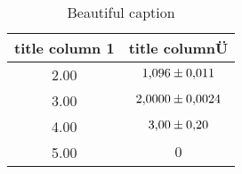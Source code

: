 \begin{table}
 \caption{Beautiful caption}
 \label{tab:important_label}
 \centering
{}
 \begin{tabular}{SS}
 \toprule 
    {title column 1}& {title columnÜ} \\
      & $\num{1.096\pm0.011}$ \\
           3.00 & $\num{2.0000\pm0.0024}$ \\
           4.00 & $\num{3.00\pm0.20}$ \\
           5.00 & $\num{0}$ \\
 \bottomrule
 \end{tabular}
\end{table}